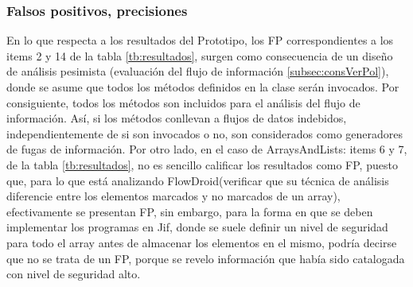 \subsubsection{Falsos positivos, precisiones}
En lo que respecta a los resultados del Prototipo, los FP correspondientes a los
items 2 y 14 de la tabla \ref{tb:resultados}, surgen como consecuencia de un
diseño de análisis pesimista (evaluación del flujo de información
\ref{subsec:consVerPol}), donde se asume que todos los métodos definidos en
la clase serán invocados. Por consiguiente, todos los métodos son incluidos para
el análisis del flujo de información. Así, si los métodos conllevan a flujos de
datos indebidos, independientemente de si son invocados o no, son considerados
como generadores de fugas de información.\newline 
Por otro lado, en el caso de ArraysAndLists: items 6 y 7, de la tabla
\ref{tb:resultados}, no es sencillo calificar los resultados como FP, puesto
que, para lo que está analizando FlowDroid(verificar que su técnica de análisis
diferencie entre los elementos marcados y no marcados de un array),
efectivamente se presentan FP, sin embargo, para la forma en que se deben
implementar los programas en Jif, donde se suele definir un nivel de seguridad
para todo el array antes de almacenar los elementos en el mismo, podría decirse
que no se trata de un FP, porque se revelo información que había sido catalogada
con nivel de seguridad alto.

